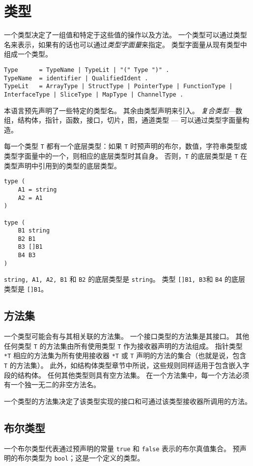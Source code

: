 \chapter{类型}
一个类型决定了一组值和特定于这些值的操作以及方法。
一个类型可以通过类型名来表示，如果有的话也可以通过\emph{类型字面量}来指定。
类型字面量从现有类型中组成一个类型。

\begin{lstlisting}[style=EBNF]
Type      = TypeName | TypeLit | "(" Type ")" .
TypeName  = identifier | QualifiedIdent .
TypeLit   = ArrayType | StructType | PointerType | FunctionType | InterfaceType | SliceType | MapType | ChannelType .
\end{lstlisting}

本语言预先声明了一些特定的类型名。
其余由类型声明来引入。
\emph{复合类型}---数组，结构体，指针，函数，接口，切片，图，通道类型 --- 可以通过类型字面量构造。

每一个类型 \lstinline|T| 都有一个底层类型：如果 \lstinline|T| 时预声明的布尔，数值，字符串类型或类型字面量中的一个，则相应的底层类型时其自身。
否则，\lstinline|T| 的底层类型是 \lstinline|T| 在类型声明中引用到的类型的底层类型。
\begin{lstlisting}[style=golang]
type (
	A1 = string
	A2 = A1
)

type (
	B1 string
	B2 B1
	B3 []B1
	B4 B3
)
\end{lstlisting}
\lstinline|string, A1, A2, B1| 和 \lstinline|B2| 的底层类型是 \lstinline|string|。
类型 \lstinline|[]B1, B3|和 \lstinline|B4| 的底层类型是 \lstinline|[]B1|。


\section{方法集}
一个类型可能会有与其相关联的方法集。
一个接口类型的方法集是其接口。
其他任何类型 \lstinline|T| 的方法集由所有使用类型 \lstinline|T| 作为接收器声明的方法组成。
指针类型 \lstinline|*T| 相应的方法集为所有使用接收器 \lstinline|*T| 或 \lstinline|T| 声明的方法的集合（也就是说，包含 \lstinline|T| 的方法集）。
此外，如结构体类型章节中所说，这些规则同样适用于包含嵌入字段的结构体。
任何其他类型则具有空方法集。
在一个方法集中，每一个方法必须有一个独一无二的非空方法名。

一个类型的方法集决定了该类型实现的接口和可通过该类型接收器所调用的方法。

\section{布尔类型}
一个布尔类型代表通过预声明的常量 \lstinline|true| 和 \lstinline|false| 表示的布尔真值集合。
预声明的布尔类型为 \lstinline|bool|；这是一个定义的类型。

